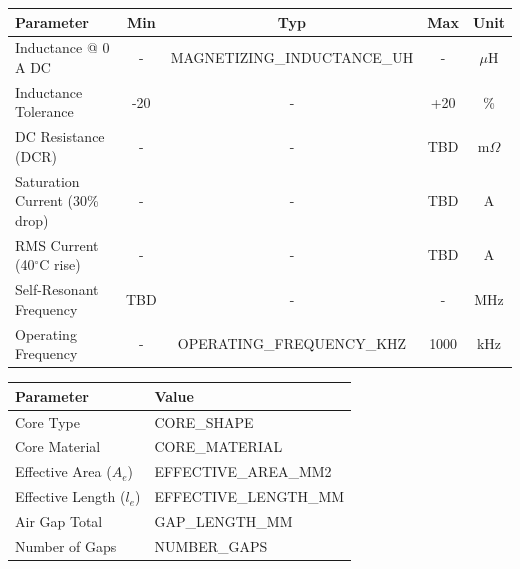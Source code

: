 \documentclass[10pt,a4paper]{article}
\begin{document}
\begin{minipage}[t]{0.52\textwidth}

\noindent{\large\bfseries\textcolor{headerblue}{Electrical Specifications}}
\vspace{2mm}

{\footnotesize
\begin{tabular}{|p{4.5cm}|c|c|c|c|}
\hline
\rowcolor{lightblue}
\textbf{Parameter} & \textbf{Min} & \textbf{Typ} & \textbf{Max} & \textbf{Unit} \\
\hline
Inductance @ 0 A DC & - & {{MAGNETIZING_INDUCTANCE_UH}} & - & $\mu$H \\
\hline
Inductance Tolerance & -20 & - & +20 & \% \\
\hline
DC Resistance (DCR) & - & - & TBD & m$\Omega$ \\
\hline
Saturation Current (30\% drop) & - & - & TBD & A \\
\hline
RMS Current (40$^\circ$C rise) & - & - & TBD & A \\
\hline
Self-Resonant Frequency & TBD & - & - & MHz \\
\hline
Operating Frequency & - & {{OPERATING_FREQUENCY_KHZ}} & 1000 & kHz \\
\hline
\end{tabular}
}

\vspace{4mm}

\noindent{\large\bfseries\textcolor{headerblue}{Core Information}}
\vspace{2mm}

{\footnotesize
\begin{tabular}{|l|l|}
\hline
\rowcolor{lightblue}
\textbf{Parameter} & \textbf{Value} \\
\hline
Core Type & {{CORE_SHAPE}} \\
\hline
Core Material & {{CORE_MATERIAL}} \\
\hline
Effective Area ($A_e$) & {{EFFECTIVE_AREA_MM2}} \\
\hline
Effective Length ($l_e$) & {{EFFECTIVE_LENGTH_MM}} \\
\hline
Air Gap Total & {{GAP_LENGTH_MM}} \\
\hline
Number of Gaps & {{NUMBER_GAPS}} \\
\hline
\end{tabular}
}


\end{minipage}
\end{document}
